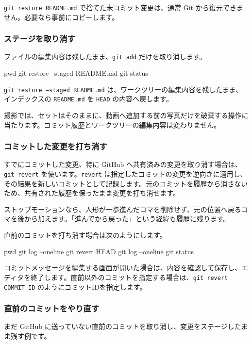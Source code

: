 \documentclass[a4paper,11pt]{jlreq}
\newcommand{\cmd}[1]{\texttt{#1}}
\begin{document}
\cmd{git restore README.md} で捨てた未コミット変更は、通常 Git から復元できません。必要なら事前にコピーします。

\subsubsection{ステージを取り消す}

ファイルの編集内容は残したまま、\cmd{git add} だけを取り消します。

\begin{codeblock}
pwd
git restore --staged README.md
git status
\end{codeblock}

\cmd{git restore --staged README.md} は、ワークツリーの編集内容を残したまま、インデックスの \cmd{README.md} を \cmd{HEAD} の内容へ戻します。

撮影では、セットはそのままに、動画へ追加する前の写真だけを破棄する操作に当たります。コミット履歴とワークツリーの編集内容は変わりません。

\subsubsection{コミットした変更を打ち消す}

すでにコミットした変更、特に GitHub へ共有済みの変更を取り消す場合は、\cmd{git revert} を使います。\cmd{revert} は指定したコミットの変更を逆向きに適用し、その結果を新しいコミットとして記録します。元のコミットを履歴から消さないため、共有された履歴を保ったまま変更を打ち消せます。

ストップモーションなら、人形が一歩進んだコマを削除せず、元の位置へ戻るコマを後から加えます。「進んでから戻った」という経緯も履歴に残ります。

直前のコミットを打ち消す場合は次のようにします。

\begin{codeblock}
pwd
git log --oneline
git revert HEAD
git log --oneline
git status
\end{codeblock}

コミットメッセージを編集する画面が開いた場合は、内容を確認して保存し、エディタを終了します。直前以外のコミットを指定する場合は、\cmd{git revert COMMIT-ID} のようにコミットIDを指定します。

\subsubsection{直前のコミットをやり直す}

まだ GitHub に送っていない直前のコミットを取り消し、変更をステージしたまま残す例です。
\end{document}
